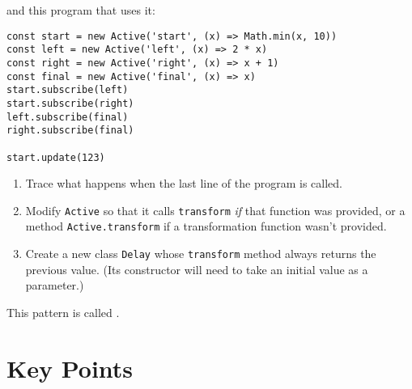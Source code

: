 \noindent
and this program that uses it:

\begin{verbatim}
const start = new Active('start', (x) => Math.min(x, 10))
const left = new Active('left', (x) => 2 * x)
const right = new Active('right', (x) => x + 1)
const final = new Active('final', (x) => x)
start.subscribe(left)
start.subscribe(right)
left.subscribe(final)
right.subscribe(final)

start.update(123)
\end{verbatim}

\begin{enumerate}
\item
  Trace what happens when the last line of the program is called.
\item
  Modify \texttt{Active} so that it calls \texttt{transform} \emph{if} that function was provided,
  or a method \texttt{Active.transform} if a transformation function wasn't provided.
\item
  Create a new class \texttt{Delay} whose \texttt{transform} method always returns the previous value.
  (Its constructor will need to take an initial value as a parameter.)
\end{enumerate}

This pattern is called .

\section*{Key Points}


